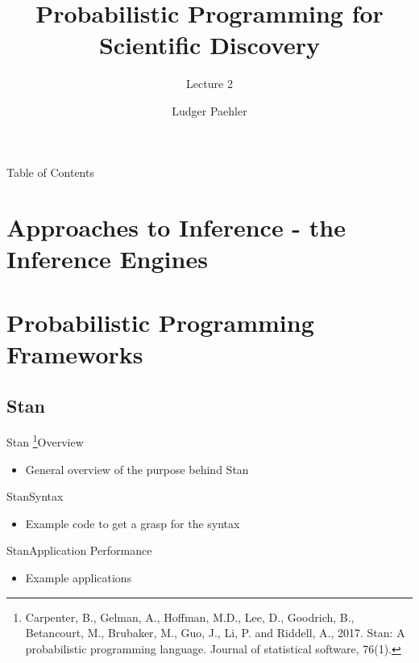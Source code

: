 \documentclass[AERbeamer%
              ,optEnglish%
              ,optBiber%
              ,optBibstyleAlphabetic%
              ,optBeamerClassicFormat%
              ]{AERlatex}%
\title{Probabilistic Programming for Scientific Discovery}%
\subtitle{Lecture 2}
\author{Ludger Paehler}%
\date{\AERutilsDate{29}{7}{2020}}%
\institute{Lviv Data Science Summer School}%
\begin{document}
%
%
\AERbeamerTitlePageDefault%
%
%

\begin{frame}{Table of Contents}{}%
    \tableofcontents
\end{frame}%


\section{Approaches to Inference - the Inference Engines}



\section{Probabilistic Programming Frameworks}


\subsection{Stan}
\begin{frame}[c]{Stan \footnote{Carpenter, B., Gelman, A., Hoffman, M.D., Lee, D.,
                                Goodrich, B., Betancourt, M., Brubaker, M., Guo, J., Li, P.
                                and Riddell, A., 2017. Stan: A probabilistic programming
                                language. Journal of statistical software, 76(1).}}{Overview}
    \centering
    \begin{itemize}
        \item General overview of the purpose behind Stan
    \end{itemize}
\end{frame}


\begin{frame}[c]{Stan}{Syntax}
    \centering
    \begin{itemize}
        \item Example code to get a grasp for the syntax
    \end{itemize}
\end{frame}


\begin{frame}[c]{Stan}{Application Performance}
    \centering
    \begin{itemize}
        \item Example applications
    \end{itemize}
\end{frame}
\end{document}
